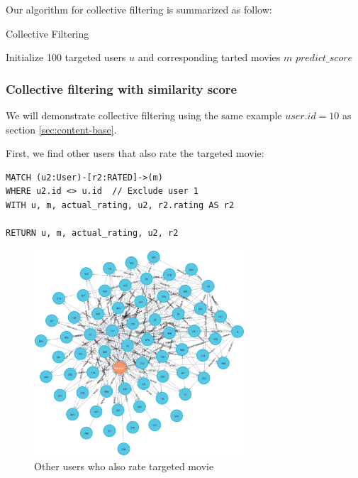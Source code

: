\documentclass{article}
\begin{document}
Our algorithm for collective filtering is summarized as follow: 

\begin{algorithm}[H]
\caption{Collective Filtering}
Initialize 100 targeted users $u$ and corresponding tarted movies $m$\;
\Return $predict\_score$\;
\end{algorithm}


\subsubsection{Collective filtering with similarity score }\label{sec:similarityscore}

We will demonstrate collective filtering using the same example $user.id = 10$ as section \ref{sec:content-base}.

First, we find other users that also rate the targeted movie: 

\begin{verbatim}
MATCH (u2:User)-[r2:RATED]->(m)
WHERE u2.id <> u.id  // Exclude user 1
WITH u, m, actual_rating, u2, r2.rating AS r2

RETURN u, m, actual_rating, u2, r2
\end{verbatim}

\begin{figure}[htbp]
    \centering
    \includegraphics[width=0.7\textwidth]{figures/graph-u2-rate-m.png} 
    \caption{Other users who also rate targeted movie}
    \label{fig:graph-u2-rate-m}
\end{figure}
\end{document}
